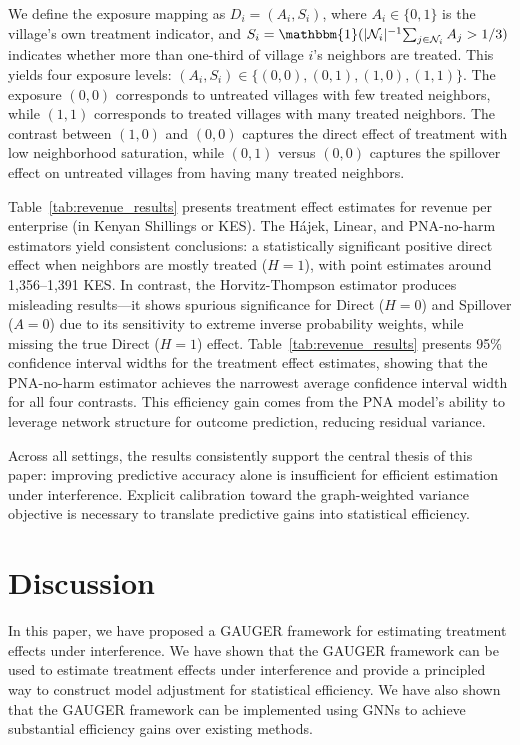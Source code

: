 \documentclass[twoside]{article}
\theoremstyle{plain}
\theoremstyle{definition}
\theoremstyle{remark}
\newcommand{\cN}{\mathcal{N}}
\newcommand{\indicator}{\mathbbm{1}}
\begin{document}
We define the exposure mapping as $D_i = (A_i, S_i)$, where $A_i \in \{0, 1\}$ is the village's own treatment indicator, and $S_i = \indicator({|\cN_i|^{-1}}{\sum_{j \in \cN_i} A_j} > {1}/{3})$ indicates whether more than one-third of village $i$'s neighbors are treated. This yields four exposure levels: $(A_i, S_i) \in \{(0,0), (0,1), (1,0), (1,1)\}$. The exposure $(0,0)$ corresponds to untreated villages with few treated neighbors, while $(1,1)$ corresponds to treated villages with many treated neighbors. The contrast between $(1,0)$ and $(0,0)$ captures the direct effect of treatment with low neighborhood saturation, while $(0,1)$ versus $(0,0)$ captures the spillover effect on untreated villages from having many treated neighbors.

Table~\ref{tab:revenue_results} presents treatment effect estimates for revenue per enterprise (in Kenyan Shillings or KES). The H\'{a}jek, Linear, and PNA-no-harm estimators yield consistent conclusions: a statistically significant positive direct effect when neighbors are mostly treated ($H=1$), with point estimates around 1,356--1,391 KES. In contrast, the Horvitz-Thompson estimator produces misleading results---it shows spurious significance for Direct ($H=0$) and Spillover ($A=0$) due to its sensitivity to extreme inverse probability weights, while missing the true Direct ($H=1$) effect. Table~\ref{tab:revenue_results} presents 95\% confidence interval widths for the treatment effect estimates, showing that the PNA-no-harm estimator achieves the narrowest average confidence interval width for all four contrasts. This efficiency gain comes from the PNA model's ability to leverage network structure for outcome prediction, reducing residual variance.

Across all settings, the results consistently support the central thesis of this paper: improving predictive accuracy alone is insufficient for efficient estimation under interference. Explicit calibration toward the graph-weighted variance objective is necessary to translate predictive gains into statistical efficiency.

\section{Discussion}
In this paper, we have proposed a GAUGER framework for estimating treatment effects under interference. We have shown that the GAUGER framework can be used to estimate treatment effects under interference and provide a principled way to construct model adjustment for statistical efficiency. We have also shown that the GAUGER framework can be implemented using GNNs to achieve substantial efficiency gains over existing methods.
\end{document}
